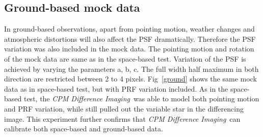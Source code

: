\documentclass[12pt, preprint]{aastex}
\newcommand{\project}[1]{\textsl{#1}}
\newcommand{\cpmdiff}{\project{CPM Difference Imaging}}
\begin{document}
\subsection{Ground-based mock data}
In ground-based observations, apart from pointing motion, weather changes and atmospheric distortions will also affect the PSF dramatically. 
Therefore the PSF variation was also included in the mock data. 
The pointing motion and rotation of the mock data are same as in the space-based test.
Variation of the PSF is achieved by varying the parameters a, b, c.
The full width half maximum in both direction are restricted between 2 to 4 pixels.
Fig~\ref{ground} shows the same mock data as in space-based test, but with PRF variation included.  
As in the space-based test,  the \cpmdiff\ was able to model both pointing motion and PRF variation, while still pulled out the variable star in the differencing image.
This experiment further confirms that \cpmdiff\ can calibrate both space-based and ground-based data.
\end{document}
